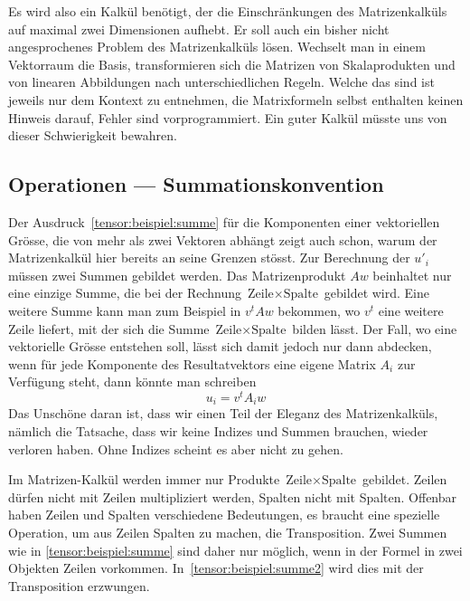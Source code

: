 Es wird also ein Kalkül benötigt, der die Einschränkungen des Matrizenkalküls
auf maximal zwei Dimensionen aufhebt.
Er soll auch ein bisher nicht angesprochenes Problem des Matrizenkalküls
lösen.
Wechselt man in einem Vektorraum die Basis, transformieren sich die 
Matrizen von Skalaprodukten und von linearen Abbildungen nach
unterschiedlichen Regeln.
Welche das sind ist jeweils nur dem Kontext zu entnehmen, die Matrixformeln
selbst enthalten keinen Hinweis darauf, Fehler sind vorprogrammiert.
Ein guter Kalkül müsste uns von dieser Schwierigkeit bewahren.

\subsection{Operationen --- Summationskonvention}
Der Ausdruck~\eqref{tensor:beispiel:summe} für die Komponenten einer
vektoriellen Grösse, die von mehr als zwei Vektoren abhängt zeigt 
auch schon, warum der Matrizenkalkül hier bereits an seine Grenzen
stösst.
Zur Berechnung der $u'_i$ müssen zwei Summen gebildet werden.
Das Matrizenprodukt $Aw$ beinhaltet nur eine einzige Summe, die bei
der Rechnung $\text{Zeile}\times\text{Spalte}$ gebildet wird.
Eine weitere Summe kann man zum Beispiel in $v^tAw$ bekommen, wo 
$v^t$ eine weitere Zeile liefert, mit der sich die Summe
$\text{Zeile}\times\text{Spalte}$ bilden lässt.
Der Fall, wo eine vektorielle Grösse entstehen soll, lässt sich damit
jedoch nur dann abdecken, wenn für jede Komponente des Resultatvektors
eine eigene Matrix $A_i$ zur Verfügung steht, dann könnte man schreiben
\begin{equation}
u_i = v^tA_iw
\label{tensor:beispiel:summe2}
\end{equation}
Das Unschöne daran ist, dass wir einen Teil der Eleganz des Matrizenkalküls,
nämlich die Tatsache, dass wir keine Indizes und Summen brauchen, wieder
verloren haben.
Ohne Indizes scheint es aber nicht zu gehen.

Im Matrizen-Kalkül werden immer nur Produkte $\text{Zeile}\times\text{Spalte}$
gebildet.
Zeilen dürfen nicht mit Zeilen multipliziert werden, Spalten nicht mit Spalten.
Offenbar haben Zeilen und Spalten verschiedene Bedeutungen, es braucht
eine spezielle Operation, um aus Zeilen Spalten zu machen, die Transposition.
Zwei Summen wie in \eqref{tensor:beispiel:summe} sind daher nur möglich,
wenn in der Formel in zwei Objekten Zeilen vorkommen.
In~\eqref{tensor:beispiel:summe2} wird dies mit der Transposition
erzwungen. 

